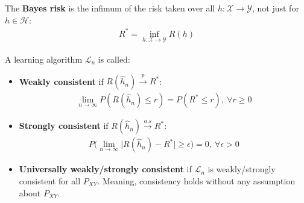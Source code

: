 \begin{definition}
    The \textbf{Bayes risk} is the infimum of the risk taken over all $h:\mathcal{X} \to \mathcal{Y}$,
    not just for $h\in\mathcal{H}$:
    \begin{align*}
        R^* = \inf_{h:\mathcal{X} \to \mathcal{Y}} R(h)
    \end{align*}
\end{definition}

\begin{definition}
    A learning algorithm $\mathcal{L}_n$ is called:
    \begin{itemize}
        \item \textbf{Weakly consistent} if $R(\hat h_n) \xrightarrow{p} R^*$:
        \begin{align*}
            \lim_{n\to\infty} P(R(\hat h_n) \le r) = P(R^* \le r), \ \forall r \ge 0
        \end{align*}
        
        \item \textbf{Strongly consistent} if $R(\hat h_n) \xrightarrow{a.s} R^*$:
        \begin{align*}
            P\Big( \lim_{n\to\infty} \Big| R(\hat h_n) - R^* \Big| \ge \epsilon \Big) = 0, \ \forall \epsilon > 0
        \end{align*}

        \item \textbf{Universally weakly/strongly consistent} if $\mathcal{L}_n$ is weakly/strongly consistent for
        all $P_{XY}$. Meaning, consistency holds without any assumption about $P_{XY}$.
    \end{itemize}
\end{definition}

